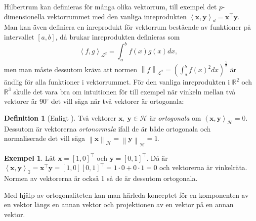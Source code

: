 \documentclass[a4paper, 12pt]{report}
\theoremstyle{definition}
\newtheorem{defi}{Definition}[section]
\newtheorem{ex}{Exempel}[section]
\theoremstyle{remark}
\newcommand{\bfx}{\mathbf{x}}
\newcommand{\bfy}{\mathbf{y}}
\newcommand{\llangle}{\left\langle}
\newcommand{\rrangle}{\right\rangle}
\newcommand{\inner}[2]{\llangle #1, #2 \rrangle}
\newcommand{\hil}{\mathcal{H}}
\begin{document}
Hilbertrum kan definieras för många olika vektorrum, till exempel det $p$-dimensionella vektorrummet med den vanliga inreprodukten $\left\langle \mathbf{x}, \mathbf{y} \right\rangle_d = \mathbf{x}^\intercal\mathbf{y}$.
Man kan även definiera en inreprodukt för vektorrum bestående av funktioner på intervallet $\left[a,b\right]$, då brukar inreprodukten definieras som
\begin{equation*}
\left\langle f, g \right\rangle_{\mathcal{L}^2}=\int_{a}^{b}f\left(x\right)g\left(x\right) dx,
\end{equation*}
men man måste dessutom kräva att normen $\left\|f\right\|_{\mathcal{L}^2} = \left(\int_{a}^{b}f\left(x\right)^2dx\right)^{\frac{1}{2}}$ är ändlig för alla funktioner i vektorrummet. För den vanliga inreprodukten i $\mathbb{R}^2$ och $\mathbb{R}^3$ skulle det vara bra om intuitionen för till exempel när vinkeln mellan två vektorer är $90^\circ$ det vill säga när två vektorer är ortogonala:

\begin{defi}[Enligt \cite{Lang}]
	Två vektorer $\bfx, ~\bfy\in\hil$ är \emph{ortogonala} om $\inner{\bfx}{\bfy}_\hil=0$. Dessutom är vektorerna \emph{ortonormala} ifall de är både ortogonala och normaliserade det vill säga $\left\|\bfx\right\|_\hil=\left\|\bfy\right\|_\hil=1$.
\end{defi}
\begin{ex}
	Låt $\bfx=\left[1,0\right]^\intercal$ och $\bfy=\left[0,1\right]^\intercal$. Då är $\inner{\bfx}{\bfy}_2=\bfx^\intercal\bfy=\left[1,0\right]\left[0,1\right]^\intercal = 1\cdot0 + 0\cdot1=0$ och vektorerna är vinkelräta. Normen av vektorerna är också 1 så de är dessutom ortogonala.
\end{ex}

Med hjälp av ortogonaliteten kan man härleda konceptet för en komponenten av en vektor längs en annan vektor och projektionen av en vektor på en annan vektor.
\end{document}
